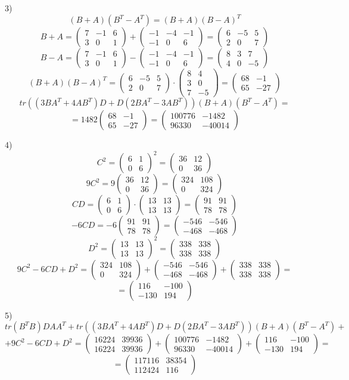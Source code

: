 \documentclass[a4paper]{article}
\newcommand{\mat}[1]{\begin{pmatrix} #1 \end{pmatrix}}
\begin{document}
\begin{enumerate}
    3) $$(B+A)(B^T-A^T) = (B+A)(B-A)^T$$
    $$B+A = \mat{7 & -1 & 6 \\ 3 & 0 & 1} + \mat{-1 & -4 & -1 \\ -1 & 0 & 6} = \mat{6 & -5 & 5 \\ 2 & 0 & 7}$$
    $$B-A = \mat{7 & -1 & 6 \\ 3 & 0 & 1} - \mat{-1 & -4 & -1 \\ -1 & 0 & 6} = \mat{8 & 3 & 7 \\ 4 & 0 & -5}$$
    $$(B+A)(B-A)^T = \mat{6 & -5 & 5 \\ 2 & 0 & 7} \cdot \mat{8 & 4 \\ 3 & 0 \\ 7 & -5} = \mat{68 & -1 \\ 65 & -27}$$
    $$tr((3BA^T+4AB^T)D+D(2BA^T-3AB^T))(B+A)(B^T-A^T) = $$
    $$=1482\mat{68 & -1 \\ 65 & -27} = \mat{100776 & -1482 \\ 96330 & -40014}$$

    4) $$C^2 = \mat{6 & 1 \\ 0 & 6}^2 = \mat{36 & 12 \\ 0 & 36}$$
    $$9C^2 = 9\mat{36 & 12 \\ 0 & 36} = \mat{324 & 108 \\ 0 & 324}$$
    $$CD = \mat{6 & 1 \\ 0 & 6} \cdot \mat{13 & 13 \\ 13 & 13} = \mat{91 & 91 \\ 78 & 78}$$
    $$-6CD = -6\mat{91 & 91 \\ 78 & 78} = \mat{-546 & -546 \\ -468 & -468}$$
    $$D^2 = \mat{13 & 13 \\ 13 & 13}^2 = \mat{338 & 338 \\ 338 & 338}$$
    $$9C^2-6CD + D^2 = \mat{324 & 108 \\ 0 & 324} + \mat{-546 & -546 \\ -468 & -468} + \mat{338 & 338 \\ 338 & 338} = $$
    $$= \mat{116 & -100 \\ -130 & 194}$$
    
    5)$$tr(B^TB)DAA^T+tr((3BA^T+4AB^T)D+D(2BA^T-3AB^T))(B+A)(B^T-A^T)+$$
    $$+9C^2-6CD + D^2 = \mat{16224 & 39936 \\ 16224 & 39936} + \mat{100776 & -1482 \\ 96330 & -40014} + \mat{116 & -100 \\ -130 & 194} =$$
    $$= \mat{117116 & 38354 \\ 112424 & 116}$$


\end{enumerate}
\end{document}
